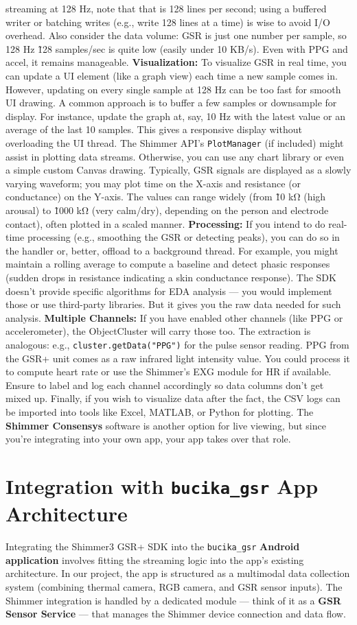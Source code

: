 streaming at 128 Hz, note that that is 128 lines per second; using a buffered writer or batching writes (e.g., write 128 lines at a time) is wise to avoid I/O overhead. Also consider the data volume: GSR is just one number per sample, so 128 Hz \~ 128 samples/sec is quite low (easily under 10 KB/s). Even with PPG and accel, it remains manageable. \textbf{Visualization:} To visualize GSR in real time, you can update a UI element (like a graph view) each time a new sample comes in. However, updating on every single sample at 128 Hz can be too fast for smooth UI drawing. A common approach is to buffer a few samples or downsample for display. For instance, update the graph at, say, 10 Hz with the latest value or an average of the last 10 samples. This gives a responsive display without overloading the UI thread. The Shimmer API's \texttt{PlotManager} (if included) might assist in plotting data streams. Otherwise, you can use any chart library or even a simple custom Canvas drawing. Typically, GSR signals are displayed as a slowly varying waveform; you may plot time on the X-axis and resistance (or conductance) on the Y-axis. The values can range widely (from \~10 kΩ (high arousal) to \~1000 kΩ (very calm/dry), depending on the person and electrode contact), often plotted in a scaled manner. \textbf{Processing:} If you intend to do real-time processing (e.g., smoothing the GSR or detecting peaks), you can do so in the handler or, better, offload to a background thread. For example, you might maintain a rolling average to compute a baseline and detect phasic responses (sudden drops in resistance indicating a skin conductance response). The SDK doesn't provide specific algorithms for EDA analysis --- you would implement those or use third-party libraries. But it gives you the raw data needed for such analysis. \textbf{Multiple Channels:} If you have enabled other channels (like PPG or accelerometer), the ObjectCluster will carry those too. The extraction is analogous: e.g., \texttt{cluster.getData("PPG")} for the pulse sensor reading. PPG from the GSR+ unit comes as a raw infrared light intensity value. You could process it to compute heart rate or use the Shimmer's EXG module for HR if available. Ensure to label and log each channel accordingly so data columns don't get mixed up. Finally, if you wish to visualize data after the fact, the CSV logs can be imported into tools like Excel, MATLAB, or Python for plotting. The \textbf{Shimmer Consensys} software is another option for live viewing, but since you're integrating into your own app, your app takes over that role. \section{Integration with \texttt{bucika_gsr} App Architecture} Integrating the Shimmer3 GSR+ SDK into the \texttt{bucika_gsr} \textbf{Android application} involves fitting the streaming logic into the app's existing architecture. In our project, the app is structured as a multimodal data collection system (combining thermal camera, RGB camera, and GSR sensor inputs). The Shimmer integration is handled by a dedicated module --- think of it as a \textbf{GSR Sensor Service} --- that manages the Shimmer device connection and data flow. 